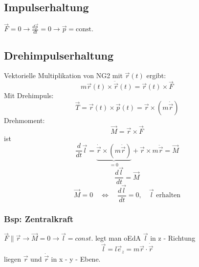 \documentclass[titlepage,12pt,a4paper,ngerman]{report}
\newcommand{\tx}[1]{\textrm{#1}}
\newcommand{\const}{\tx{const.}}
\begin{document}
{\subsection{Impulserhaltung}
$\vec{F} = 0 \rightarrow \frac{d\vec{p}}{dt} =0 \rightarrow \vec{p} = \const$

\subsection{Drehimpulserhaltung}
Vektorielle Multiplikation von NG2 mit $\vec{r} (t)$ ergibt:
$$m\vec{r}(t) \times \ddot{\vec{r}}(t) = \vec{r}(t) \times \vec{F}$$
Mit
Drehimpuls:
$$\vec{T} = \vec{r}(t) \times \vec{p}(t) = \vec{r} \times (m\dot{\vec{r}})$$ 
Drehmoment:
$$ \vec{M} = \vec{r} \times \vec{F}$$
ist
$$\frac{d}{dt}\vec{l} = \underbrace{\dot{\vec{r}} \times (m\dot{\vec{r}})}_{ =0} + \vec{r} \times m \ddot{\vec{r}} = \vec{M}$$
$$\frac{d\vec{l}}{dt} = \vec{M}$$
$$\vec{M} = 0 \quad \Leftrightarrow \quad \frac{d \vec{l}}{dt} = 0 , \quad \vec{l} \textrm{ erhalten}$$

\subsubsection{Bsp: Zentralkraft}
$\vec{F} \parallel  \vec{r} \rightarrow \vec{M} = 0 \rightarrow \vec{l}  = const.$
legt man oEdA $\vec{l}$ in z - Richtung \\
$$\vec{l} = l \vec{e}_z = m \vec{r}\cdot \dot{\vec{r}}$$
liegen $\vec{r}$ und $ \dot{\vec{r}}$ in x - y - Ebene.\par

}
\end{document}
